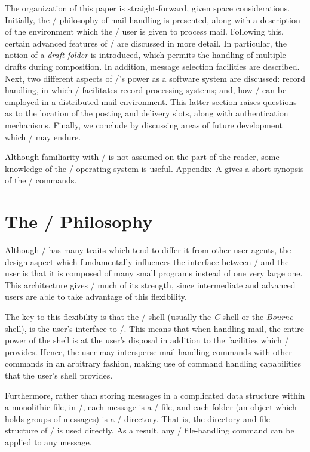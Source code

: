 The organization of this paper is straight-forward,
given space considerations.
Initially,
the \MH/ philosophy of mail handling is presented,
along with a description of the environment which the \MH/ user is given to
process mail.
Following this,
certain advanced features of \MH/ are discussed in more detail.
In particular,
the notion of a {\it draft folder} is introduced,
which permits the handling of multiple drafts during composition.
In addition,
message selection facilities are described.
Next,
two different aspects of \MH/'s power as a software system are discussed:
record handling, in which \MH/ facilitates record processing systems;
and,
how \MH/ can be employed in a distributed mail environment.
This latter section raises questions as to the location of the posting and
delivery slots,
along with authentication mechanisms.
Finally,
we conclude by discussing areas of future development which \MH/ may endure.

Although familiarity with \MH/ is not assumed on the part of the reader,
some knowledge of the \unix/ operating system is useful.
Appendix~A gives a short synopsis of the \MH/ commands.

\section{The \MH/ Philosophy}			%
Although \MH/ has many traits which tend to differ it from other user agents,
the design aspect which fundamentally influences the interface between \MH/
and the user is that it is composed of many small
programs instead of one very large one.
This architecture gives \MH/ much of its strength,
since intermediate and advanced users are able to take advantage of this
flexibility.

The key to this flexibility is that the \unix/ shell
(usually the {\it C} shell or the {\it Bourne} shell),
is the user's interface to \MH/.
This means that when handling mail,
the entire power of the shell is at the user's disposal in addition to the
facilities which \MH/ provides.
Hence,
the user may intersperse mail handling commands with other commands in an
arbitrary fashion,
making use of command handling capabilities that the user's shell provides.

Furthermore,
rather than storing messages in a complicated data structure
within a monolithic file,
in \MH/, each message is a \unix/ file,
and each folder (an object which holds groups of messages)
is a \unix/ directory.
That is,
the directory and file structure of \unix/ is used directly.
As a result,
any \unix/ file-handling command can be applied to any message.

